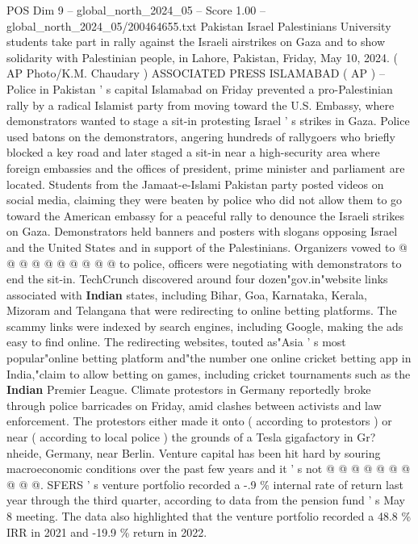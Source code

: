 \begin{textsample}{POS Dim 9 – global\_north\_2024\_05 – Score 1.00 – global\_north\_2024\_05/200464655.txt}  \label{ex:f9_pos_214}
Pakistan Israel Palestinians University students take part in rally against the Israeli airstrikes on Gaza and to show solidarity with Palestinian people, in Lahore, Pakistan, Friday, May 10, 2024. ( AP Photo/K.M.
Chaudary ) ASSOCIATED PRESS ISLAMABAD ( AP ) -- Police in Pakistan ' s capital Islamabad on Friday prevented a pro-Palestinian rally by a radical Islamist party from moving toward the U.S.
Embassy, where demonstrators wanted to stage a sit-in protesting Israel ' s strikes in Gaza.
Police used batons on the demonstrators, angering hundreds of rallygoers who briefly blocked a key road and later staged a sit-in near a high-security area where foreign embassies and the offices of president, prime minister and parliament are located.
Students from the Jamaat-e-Islami Pakistan party posted videos on social media, claiming they were beaten by police who did not allow them to go toward the American embassy for a peaceful rally to denounce the Israeli strikes on Gaza.
Demonstrators held banners and posters with slogans opposing Israel and the United States and in support of the Palestinians.
Organizers vowed to @ @ @ @ @ @ @ @ @ @ to police, officers were negotiating with demonstrators to end the sit-in.
TechCrunch discovered around four dozen"gov.in"website links associated with \textbf{Indian} states, including Bihar, Goa, Karnataka, Kerala, Mizoram and Telangana that were redirecting to online betting platforms.
The scammy links were indexed by search engines, including Google, making the ads easy to find online.
The redirecting websites, touted as"Asia ' s most popular"online betting platform and"the number one online cricket betting app in India,"claim to allow betting on games, including cricket tournaments such as the \textbf{Indian} Premier League.
Climate protestors in Germany reportedly broke through police barricades on Friday, amid clashes between activists and law enforcement.
The protestors either made it onto ( according to protestors ) or near ( according to local police ) the grounds of a Tesla gigafactory in Gr? nheide, Germany, near Berlin.
Venture capital has been hit hard by souring macroeconomic conditions over the past few years and it ' s not @ @ @ @ @ @ @ @ @ @.
SFERS ' s venture portfolio recorded a -.9 \% internal rate of return last year through the third quarter, according to data from the pension fund ' s May 8 meeting.
The data also highlighted that the venture portfolio recorded a 48.8 \% IRR in 2021 and -19.9 \% return in 2022.

\end{textsample}
